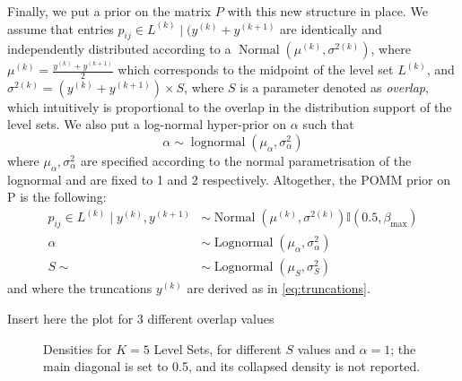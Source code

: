\documentclass[11pt]{amsart}
\begin{document}
Finally, we put a prior on the matrix $P$ with this new structure in place.
We assume that entries $p_{ij} \in L^{(k)} \mid (y^{(k)} + y^{(k+1)}$ are identically and independently distributed according to a $\operatorname{Normal}(\mu^{(k)},\sigma^{2(k)})$, where $\mu^{(k)} = \frac{y^{(k)}+y^{(k+1)}}{2}$ which corresponds to the midpoint of the level set $L^{(k)}$, and $\sigma^{2(k)} = \left( y^{(k)}+y^{(k+1)} \right) \times S$, where $S$ is a parameter denoted as \textit{overlap}, which intuitively is proportional to the overlap in the distribution support of the level sets.   We also put a log-normal hyper-prior on $\alpha$ such that 
\begin{equation}
\alpha \sim \operatorname{lognormal}(\mu_\alpha, \sigma^2_\alpha)
\end{equation}
where $\mu_\alpha, \sigma^2_\alpha$ are specified according to the normal parametrisation of the lognormal and are fixed to 1 and 2 respectively.
Altogether, the POMM prior on P is the following:
\begin{align}
p_{ij} \in L^{(k)} \mid y^{(k)},y^{(k+1)} &\sim \operatorname{Normal}\left(\mu^{(k)},\sigma^{2(k)}\right) \mathbb{I}(0.5, \beta_{\max}) \\
\alpha &\sim \operatorname{Lognormal}\left(\mu_\alpha, \sigma^2_\alpha\right)\\
S \sim &\sim \operatorname{Lognormal}\left(\mu_S, \sigma^2_S \right)
\end{align}
and where the truncations $y^{(k)}$ are derived as in \eqref{eq:truncations}.


Insert here the plot for 3 different overlap values





\begin{figure}[htbp]
    \centering
    \hfill
    \hfill
    \caption{Densities for $K=5$ Level Sets, for different $S$ values and $\alpha=1$; the main diagonal is set to 0.5, and its collapsed density is not reported.}
    \label{fig:all_images}
\end{figure} 
\end{document}
